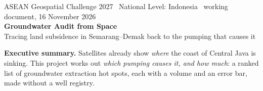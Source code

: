 \thispagestyle{empty}
\newcommand{\xhead}[2]{\par\vspace{2.2mm}\noindent
  {\sffamily\bfseries\small\color{accent}\MakeUppercase{#1}}\hfill{\sffamily\scriptsize\color{muted}#2}\\[-7pt]
  {\color{line}\rule{\linewidth}{0.5pt}}\par\vspace{0.6mm}}
\newcommand{\xyes}{\textcolor{green}{\large\checkmark}}
\newcommand{\xno}{\textcolor{line}{\rule[2pt]{9pt}{1.2pt}}}
\newcommand{\xpart}{\textcolor{muted}{\sffamily\scriptsize partly}}
\newcommand{\tilebig}[2]{{\sffamily\bfseries\fontsize{19}{21}\selectfont\color{#1}#2}\\[2pt]}

\begin{center}
{\sffamily\scriptsize\color{muted} ASEAN Geospatial Challenge 2027 \textbullet\ National Level: Indonesia \textbullet\ working document, 16 November 2026}\\[3mm]
{\sffamily\bfseries\fontsize{24}{27}\selectfont\color{ink} Groundwater Audit from Space}\\[2mm]
{\sffamily\large\color{accent} Tracing land subsidence in Semarang--Demak back to the pumping that causes it}
\end{center}
\vspace{-1mm}

\begin{tcolorbox}[enhanced,colback=accent,colframe=accent,boxrule=0pt,arc=2pt,left=10pt,right=10pt,top=7pt,bottom=7pt]
\sffamily\color{white}\textbf{Executive summary.} Satellites already show \emph{where} the coast of Central Java
is sinking. This project works out \emph{which pumping causes it, and how much}: a ranked list of
groundwater extraction hot spots, each with a volume and an error bar, made without a well registry.
\end{tcolorbox}

